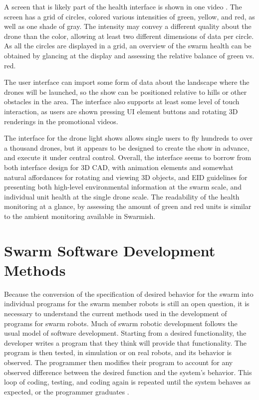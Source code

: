 A screen that is likely part of the health interface is shown in one video \citep{OlympicTech}.
The screen has a grid of circles, colored various intensities of green, yellow, and red, as well as one shade of gray. 
The intensity may convey a different quality about the drone than the color, allowing at least two different dimensions of data per circle. 
As all the circles are displayed in a grid, an overview of the swarm health can be obtained by glancing at the display and assessing the relative balance of green vs. red. 

The user interface can import some form of data about the landscape where the drones will be launched, so the show can be positioned relative to hills or other obstacles in the area. 
The interface also supports at least some level of touch interaction, as users are shown pressing UI element buttons and rotating 3D renderings in the promotional videos. 

The interface for the drone light shows allows single users to fly hundreds to over a thousand drones, but it appears to be designed to create the show in advance, and execute it under central control. 
Overall, the interface seems to borrow from both interface design for 3D CAD, with animation elements and somewhat natural affordances for rotating and viewing 3D objects, and EID guidelines for presenting both high-level environmental information at the swarm scale, and individual unit health at the single drone scale. 
The readability of the health monitoring at a glance, by assessing the amount of green and red units is similar to the ambient monitoring available in Swarmish. 


\section{Swarm Software Development Methods} \label{section:Swarm_Software_Development_Methods}

Because the conversion of the specification of desired behavior for the swarm into individual programs for the swarm member robots is still an open question, it is necessary to understand the current methods used in the development of programs for swarm robots. 
Much of swarm robotic development follows the usual model of software development. 
Starting from a desired functionality, the developer writes a program that they think will provide that functionality.
The program is then tested, in simulation or on real robots, and its behavior is observed. 
The programmer then modifies their program to account for any observed difference between the desired function and the system's behavior. 
This loop of coding, testing, and coding again is repeated until the system behaves as expected, or the programmer graduates \citep{cham2010graduate}. 

